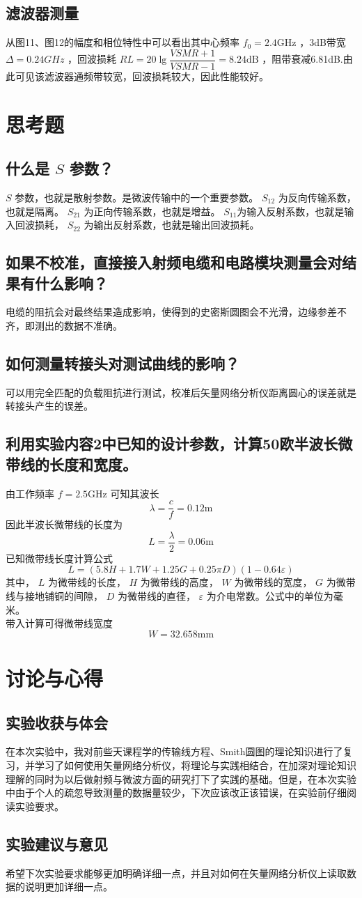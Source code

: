 \documentclass{source/Report}
\begin{document}
\subsection{滤波器测量}
从图11、图12的幅度和相位特性中可以看出其中心频率 $f_0=\text{2.4GHz}$ ，3dB带宽 $\Delta = 0.24GHz$ ，回波损耗 $\displaystyle RL={20\lg\dfrac{VSMR+1}{VSMR-1}}=8.24\text{dB}$ ，阻带衰减6.81dB.由此可见该滤波器通频带较宽，回波损耗较大，因此性能较好。
\section{思考题}
\subsection{什么是 $S$ 参数？}
$S$ 参数，也就是散射参数。是微波传输中的一个重要参数。 $S_{12}$ 为反向传输系数，也就是隔离。 $S_{21}$ 为正向传输系数，也就是增益。 $S_{11}$为输入反射系数，也就是输入回波损耗， $S_{22}$ 为输出反射系数，也就是输出回波损耗。
\subsection{如果不校准，直接接入射频电缆和电路模块测量会对结果有什么影响？}
电缆的阻抗会对最终结果造成影响，使得到的史密斯圆图会不光滑，边缘参差不齐，即测出的数据不准确。
\subsection{如何测量转接头对测试曲线的影响？}
可以用完全匹配的负载阻抗进行测试，校准后矢量网络分析仪距离圆心的误差就是转接头产生的误差。
\subsection{利用实验内容2中已知的设计参数，计算50欧半波长微带线的长度和宽度。}
由工作频率 $f=2.5\text{GHz}$ 可知其波长
$$\lambda=\dfrac{c}{f}=0.12\text{m}$$
因此半波长微带线的长度为
$$L=\dfrac{\lambda}{2}=0.06\text{m}$$
已知微带线长度计算公式
$$ L=(5.8H+1.7W+1.25G+0.25\pi D)(1-0.64\varepsilon) $$
其中， $L$ 为微带线的长度， $H$ 为微带线的高度， $W$ 为微带线的宽度， $G$ 为微带线与接地铺铜的间隙， $D$ 为微带线的直径， $\varepsilon$ 为介电常数。公式中的单位为毫米。\\
带入计算可得微带线宽度
$$ W=32.658\text{mm} $$
\section{讨论与心得}
\subsection{实验收获与体会}
在本次实验中，我对前些天课程学的传输线方程、Smith圆图的理论知识进行了复习，并学习了如何使用矢量网络分析仪，将理论与实践相结合，在加深对理论知识理解的同时为以后做射频与微波方面的研究打下了实践的基础。但是，在本次实验中由于个人的疏忽导致测量的数据量较少，下次应该改正该错误，在实验前仔细阅读实验要求。
\subsection{实验建议与意见}
希望下次实验要求能够更加明确详细一点，并且对如何在矢量网络分析仪上读取数据的说明更加详细一点。
\end{document}
